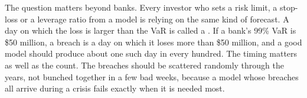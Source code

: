 The question matters beyond banks. Every investor who sets a risk limit, a stop-loss or a leverage ratio from a model is relying on the same kind of forecast. A day on which the loss is larger than the VaR is called a . If a bank's 99\% VaR is \$50 million, a breach is a day on which it loses more than \$50 million, and a good model should produce about one such day in every hundred. The timing matters as well as the count. The breaches should be scattered randomly through the years, not bunched together in a few bad weeks, because a model whose breaches all arrive during a crisis fails exactly when it is needed most.
\begin{figure}[htbp]
\centering
{}
\end{figure}
